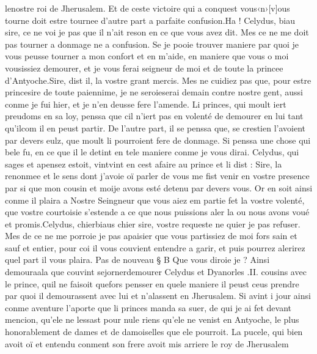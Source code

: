 \documentclass{article}
\begin{document}
\begin{pages}
      lenostre roi de 
         Jherusalem. 
      Et de ceste victoire qui a conquest vous‹n›[v]ous tourne doit estre tournee 
      d’autre part a parfaite confusion.Ha ! Celydus, biau sire, ce ne voi je pas que il n’ait reson 
      en ce que vous avez dit. Mes ce ne me doit pas tourner a donmage ne a confusion. Se je pooie trouver 
      maniere par quoi je vous peusse tourner a mon confort et en m’aide, 
      en maniere que vous o moi vousissiez demourer, et je vous ferai seigneur de moi et 
   de toute la princee d’Antyoche.Sire, dist il, la vostre grant mercis. Mes ne cuidiez pas que, pour estre 
      princesire de toute paiennime, 
      je ne seroieserai demain contre nostre gent, aussi conme je fui hier, 
      et je n’en deusse fere l’amende.
   Li princes, qui moult iert preudoms en sa loy, penssa que cil 
      n’iert pas en volenté de demourer en lui tant qu'ilcom il en peust 
      partir. De l’autre part, il se penssa que, se crestien l’avoient par devers eulz, 
      que moult li pourroient fere de donmage. Si penssa une chose qui bele fu, en ce que il 
         le detint en tele maniere conme je vous dirai. \pend
\pstart Celydus, qui sages et apensez estoit, 
   vintvint en cest afaire au 
   prince et li dist :
   Sire, la renonmee et le sens dont j’avoie oï parler de vous me fist venir en vostre presence par si que 
      mon cousin et moije avons esté 
      detenu par devers vous. Or en soit ainsi conme il plaira a Nostre Seingneur 
      que vous aiez em partie fet la vostre volenté, que 
      vostre courtoisie s’estende a ce que nous 
      puissions aler la ou nous avons voué et promis.Celydus, 
      chierbiaus chier sire, vostre requeste ne quier je pas refuser. 
   Mes de ce ne me porroie je pas apaisier que vous partissiez de moi fors sain et sauf et entier, pour coi il vous couvient entendre a garir, 
   et puis pourrez alerirez quel part il vous plaira. \pend
\pstart Pas de nouveau § B
   Que vous diroie je ? 
   Ainsi demouraala que couvint 
      sejornerdemourer 
   Celydus et 
      Dyanorles .II. cousins avec le prince, quil ne faisoit 
   quefors pensser 
   en quele maniere il peust ceus prendre par quoi il demourassent 
      avec lui et n’alassent en Jherusalem. Si avint i jour ainsi 
   conme aventure l’aporte que li princes 
   manda sa suer, 
   de qui je ai fet devant mencion, qu’ele ne lessast pour nule riens 
   qu’ele ne venist en Antyoche, le plus honorablement de dames et de damoiselles que ele pourroit. 
   La pucele, qui bien avoit oï et entendu conment son frere 
   avoit mis arriere le roy de Jherusalem 

\end{pages}
\end{document}
